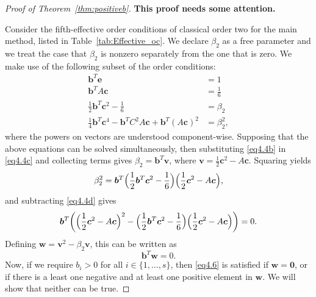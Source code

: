 
\begin{proof}[Proof of Theorem~\ref{thm:positiveb}]
    {\bf This proof needs some attention.}

    Consider the fifth-effective order conditions of classical order two for the main method, listed in Table~\ref{tab:Effective_oc}. We declare \( \beta_{2} \) as a free parameter and we treat the case that \( \beta_{2} \) is nonzero separately from the one that is zero. We make use of the following subset of the order conditions:
    \begin{subequations}\label{eq4.4}
        \begin{align}
            \bm{b}^{T}\bm{e} &= 1 \label{eq4.4a} \\
            \bm{b}^{T}A\bm{c} &= \frac{1}{6} \label{eq4.4b} \\
            \frac{1}{2}\bm{b}^{T}\bm{c}^{2} - \frac{1}{6} &= \beta_{2} \label{eq4.4c} \\
            \frac{1}{4}\bm{b}^{T}\bm{c}^{4} - \bm{b}^{T}C^{2}A\bm{c} + \bm{b}^{T}(A\bm{c})^{2} &= \beta_{2}^{2}, \label{eq4.4d}
        \end{align}
    \end{subequations}
    where the powers on vectors are understood component-wise. Supposing that the above equations can be solved simultaneously, then substituting \eqref{eq4.4b} in \eqref{eq4.4c} and collecting terms gives \( \beta_{2} = \bm{b}^{T}\bm{v} \), where \( \bm{v} = \frac{1}{2}\bm{c}^{2} - A\bm{c} \). Squaring yields
    \begin{equation*}%
        \beta_{2}^{2} = \bm{b}^{T}\Bigl(\frac{1}{2}\bm{b}^{T}\bm{c}^{2} - \frac{1}{6}\Bigr)\Bigl(\frac{1}{2}\bm{c}^{2} - A\bm{c}\Bigr),
    \end{equation*}
    and subtracting \eqref{eq4.4d} gives
    \begin{equation*}
        \bm{b}^{T}\biggl(\Bigl(\frac{1}{2}\bm{c}^{2} - A\bm{c}\Bigr)^{2} - \Bigl(\frac{1}{2}\bm{b}^{T}\bm{c}^{2} - \frac{1}{6}\Bigr)\Bigl(\frac{1}{2}\bm{c}^{2} - A\bm{c}\Bigr)\biggr) = 0.
    \end{equation*}
    Defining \( \bm{w} = \bm{v}^{2} - \beta_{2}\bm{v} \), this can be written as
    \begin{equation}\label{eq4.6}
        \bm{b}^{T}\bm{w} = 0.
    \end{equation}
    Now, if we require \( b_{i} > 0 \) for all \( i \in \{1,\dots, s\} \), then \eqref{eq4.6} is satisfied if \( \bm{w} = \bm{0} \),
or if there is a least one negative and at least one positive element in \( \bm{w} \).
We will show that neither can be true.



\end{proof}
